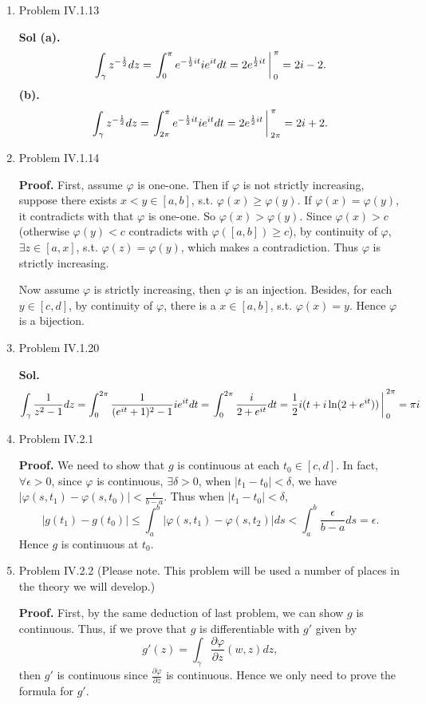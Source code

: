 \documentclass{article}%
\begin{document}
\begin{enumerate}
\item Problem IV.1.13

\textbf{Sol (a).} 
$$
\int_{\gamma}z^{-\frac{1}{2}}dz = \left.\int_{0}^{\pi}e^{-\frac{1}{2}it}ie^{it}dt = 2e^{\frac{1}{2}it}\right\arrowvert_{0}^{\pi} = 2i-2.
$$
\textbf{(b).}
$$
\int_{\gamma}z^{-\frac{1}{2}}dz = \left.\int_{2\pi}^{\pi}e^{-\frac{1}{2}it}ie^{it}dt = 2e^{\frac{1}{2}it}\right\arrowvert_{2\pi}^{\pi} = 2i+2.
$$

\item Problem IV.1.14

\textbf{Proof.} First, assume $\varphi$ is one-one. Then if $\varphi$ is not strictly increasing, suppose there exists $x < y \in [a, b]$, s.t. $\varphi(x) \ge \varphi(y)$. If $\varphi(x) = \varphi(y)$, it contradicts with that $\varphi$ is one-one. So $\varphi(x) > \varphi(y)$. Since $\varphi(x) > c$ (otherwise $\varphi(y) < c$ contradicts with $\varphi([a, b]) \ge c$), by continuity of $\varphi$, $\exists z \in [a, x]$, s.t. $\varphi(z) = \varphi(y)$, which makes a contradiction. Thus $\varphi$ is strictly increasing.

Now assume $\varphi$ is strictly increasing, then $\varphi$ is an injection. Besides, for each $y\in [c, d]$, by continuity of $\varphi$, there is a $x\in[a, b]$, s.t. $\varphi(x) = y$. Hence $\varphi$ is a bijection.

\item Problem IV.1.20

\textbf{Sol.} 
$$
\int_{\gamma}\frac{1}{z^2-1}dz = \int_{0}^{2\pi}\frac{1}{(e^{it}+1)^2-1}ie^{it}dt = \left.\int_{0}^{2\pi}\frac{i}{2+e^{it}}dt = \frac{1}{2}i(t+i\ln(2+e^{it}))\right\arrowvert_{0}^{2\pi} = \pi i
$$

\item Problem IV.2.1

\textbf{Proof.} We need to show that $g$ is continuous at each $t_0\in[c, d] $. In fact, $\forall \epsilon > 0$, since $\varphi$ is continuous, $\exists \delta > 0$, when $|t_1-t_0| < \delta $, we have $|\varphi(s, t_1)-\varphi(s, t_0)| < \frac{\epsilon}{b-a}$. Thus when $|t_1-t_0| < \delta $,
$$
|g(t_1)-g(t_0)| \le \int_{a}^{b}|\varphi(s, t_1)-\varphi(s, t_2)|ds < \int_{a}^{b}\frac{\epsilon}{b-a}ds = \epsilon.
$$
Hence $g$ is continuous at $t_0 $.

\item Problem IV.2.2  (Please note.  This problem will be used a number of places in the theory we will develop.)

\textbf{Proof.} 
First, by the same deduction of last problem, we can show $g$ is continuous. Thus, if we prove that $g$ is differentiable with $g'$ given by 
$$
g'(z) = \int_{\gamma}\frac{\partial\varphi}{\partial z}(w, z)dz,
$$
then $g'$ is continuous since $\frac{\partial \varphi}{\partial z}$ is continuous. Hence we only need to prove the formula for $g'$.


\end{enumerate}
\end{document}
